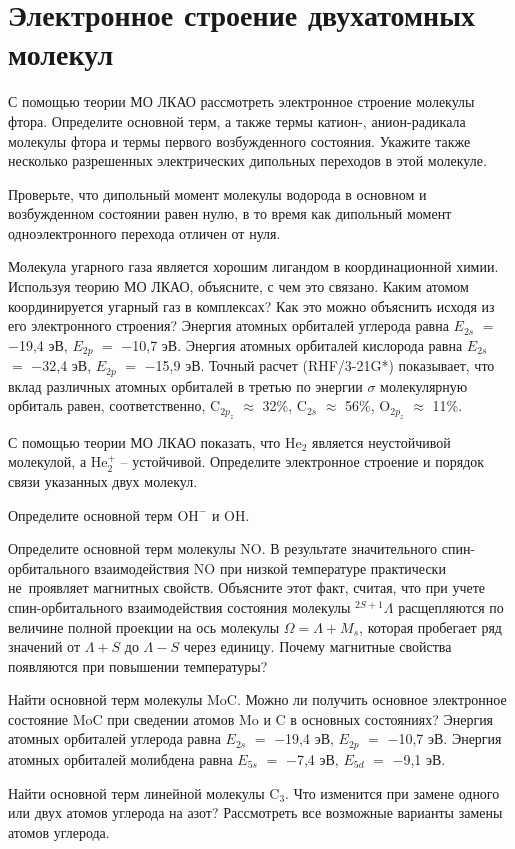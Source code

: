 \setmainfont{Noto Serif}
\setsansfont{Noto Sans}
\setmonofont{Noto Sans Mono}


\section{Электронное строение двухатомных молекул}

 С помощью теории МО ЛКАО рассмотреть электронное строение молекулы фтора. Определите основной терм, а также термы катион-, анион-радикала молекулы фтора и термы первого возбужденного состояния. Укажите также несколько разрешенных электрических дипольных переходов в этой молекуле.
\par
{} Проверьте, что дипольный момент молекулы водорода в основном и возбужденном состоянии равен нулю, в то время как дипольный момент одноэлектронного перехода отличен от нуля.
\par
{} Молекула угарного газа является хорошим лигандом в координационной химии. Используя теорию МО ЛКАО, объясните, с чем это связано. Каким атомом координируется угарный газ в комплексах? Как это можно объяснить исходя из его электронного строения? Энергия атомных орбиталей углерода равна $E_{2s}$ $=$ $-$19,4 эВ, $E_{2p}$ $=$ $-$10,7 эВ. Энергия атомных орбиталей кислорода равна $E_{2s}$~$=$ $-$32,4 эВ, $E_{2p}$ $=$ $-$15,9 эВ. Точный расчет (RHF/3-21G*) показывает, что вклад различных атомных орбиталей в третью по энергии $\sigma$ молекулярную орбиталь равен, соответственно, $\text{C}_{2p_z}$ $\approx$ 32\%, $\text{C}_{2s}$ $\approx$ 56\%, $\text{O}_{2p_z}$ $\approx$ 11\%.
\par
{} С помощью теории МО ЛКАО показать, что $\text{He}_2$ является неустойчивой молекулой, а $\text{He}_2^{+}$ – устойчивой. Определите электронное строение и порядок связи указанных двух молекул.
\par
{} Определите основной терм $\text{OH}^-$ и $\text{OH}$.
\par
{} Определите основной терм молекулы $\text{NO}$. В результате значительного спин-орбитального взаимодействия $\text{NO}$ при низкой температуре практически не~проявляет магнитных свойств. Объясните этот факт, считая, что при учете спин-орбитального взаимодействия состояния молекулы $^{2S+1}\Lambda$ расщепляются по величине полной проекции на ось молекулы $\Omega = \Lambda + M_s$, которая пробегает ряд значений от $\Lambda + S$ до $\Lambda - S$ через единицу. Почему магнитные свойства появляются при повышении температуры?
\par
{} Найти основной терм молекулы $\text{MoC}$. Можно ли получить основное электронное состояние $\text{MoC}$ при сведении атомов $\text{Mo}$ и $\text{C}$ в основных состояниях? Энергия атомных орбиталей углерода равна $E_{2s}$ $=$ $-$19,4 эВ, $E_{2p}$ $=$ $-$10,7 эВ. Энергия атомных орбиталей молибдена равна $E_{5s}$ $=$ $-$7,4 эВ, $E_{5d}$ $=$ $-$9,1 эВ.
\par
{} Найти основной терм линейной молекулы $\text{C}_3$. Что изменится при замене одного или двух атомов углерода на азот? Рассмотреть все возможные варианты замены атомов углерода.
\par
